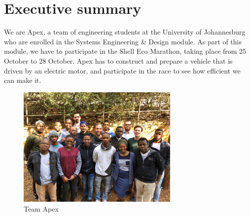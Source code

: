 \documentclass[a4paper, 12pt]{article}
\begin{document}
	\section{Executive summary} %
	\label{sec:overview}
		We are Apex, a team of engineering students at the University of Johannesburg who are enrolled in the Systems Engineering \& Design module. As part of this module, we have to participate in the Shell Eco Marathon, taking place from 25 October to 28 October. Apex has to construct and prepare a vehicle that is driven by an electric motor, and participate in the race to see how efficient we can make it.
		\vspace*{\fill}
		\begin{figure}[H]
			\centering
			\includegraphics[width=0.7\textwidth]{img/group.jpg}
			\caption{Team Apex}
		\end{figure}
\end{document}
